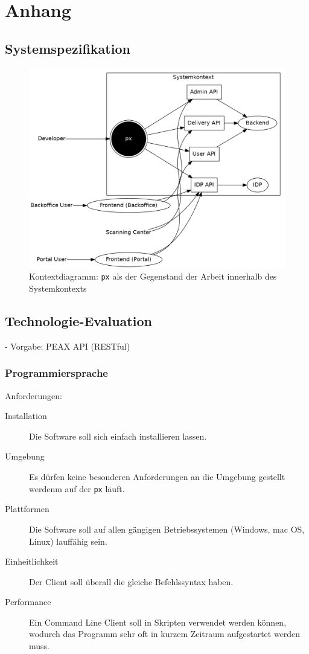 \section{Anhang}

\subsection{Systemspezifikation}

\begin{figure}
	\centering
	\includegraphics[width=\linewidth]{pics/kontextdiagramm.png}
	\caption{Kontextdiagramm: \texttt{px} als der Gegenstand der Arbeit innerhalb des Systemkontexts}
	\label{fig:kontextdiagramm}
\end{figure}

\subsection{Technologie-Evaluation}

- Vorgabe: PEAX API (RESTful)

\subsubsection{Programmiersprache}

Anforderungen:

\begin{description}
    \item[Installation] Die Software soll sich einfach installieren lassen.
    \item[Umgebung] Es dürfen keine besonderen Anforderungen an die Umgebung gestellt werdenm auf der \texttt{px} läuft.
    \item[Plattformen] Die Software soll auf allen gängigen Betriebssystemen (Windows, mac OS, Linux) lauffähig sein.
    \item[Einheitlichkeit] Der Client soll überall die gleiche Befehlssyntax haben.
    \item[Performance] Ein Command Line Client soll in Skripten verwendet werden können, wodurch das Programm sehr oft in kurzem Zeitraum aufgestartet werden muss.
\end{description}

